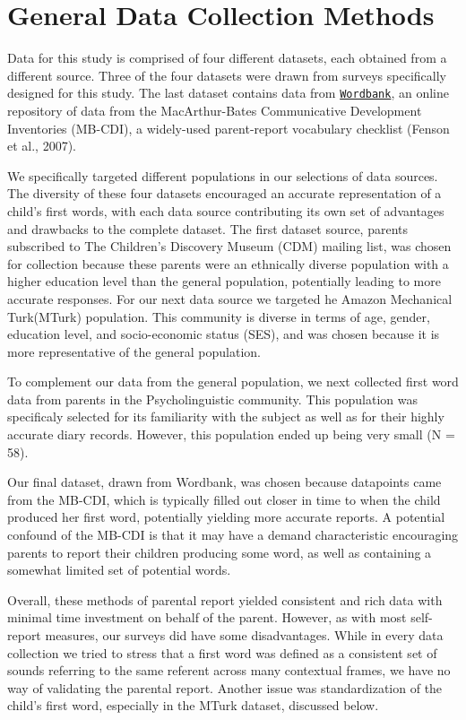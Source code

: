 \documentclass[10pt,letterpaper]{article}
\begin{document}
\section{General Data Collection Methods}
Data for this study is comprised of four different datasets, each obtained from a different source. Three of the four datasets were drawn from surveys specifically designed for this study. The last dataset contains data from \href{http://wordbank.stanford.edu}{\tt{Wordbank}}, an online repository of data from the MacArthur-Bates Communicative Development Inventories (MB-CDI), a widely-used parent-report vocabulary checklist (Fenson et al., 2007).

We specifically targeted different populations in our selections of data sources. The diversity of these four datasets encouraged an accurate representation of a child's first words, with each data source contributing its own set of advantages and drawbacks to the complete dataset. The first dataset source,  parents subscribed to The Children's Discovery Museum (CDM) mailing list, was chosen for collection because these parents were an ethnically diverse population with a higher education level than the general population, potentially leading to more accurate responses. For our next data source we targeted he Amazon Mechanical Turk(MTurk) population. This community is diverse in terms of age, gender, education level, and socio-economic status (SES), and was chosen because it is more representative of the general population.

To complement our data from the general population, we next collected first word data from parents in the Psycholinguistic community. This population was specificaly selected for its familiarity with the subject as well as for their highly accurate diary records. However, this population ended up being very small (N = 58).

Our final dataset, drawn from Wordbank, was chosen because datapoints came from the MB-CDI, which is typically filled out closer in time to when the child produced her first word, potentially yielding more accurate reports. A potential confound of the MB-CDI is that it may have a demand characteristic encouraging parents to report their children producing some word, as well as containing a somewhat limited set of potential words.

Overall, these methods of parental report yielded consistent and rich data with minimal time investment on behalf of the parent. However, as with most self-report measures, our surveys did have some disadvantages. While in every data collection we tried to stress that a first word was defined as a consistent set of sounds referring to the same referent across many contextual frames, we have no way of validating the parental report. Another issue was standardization of the child's first word, especially in the MTurk dataset, discussed below. 
\end{document}
